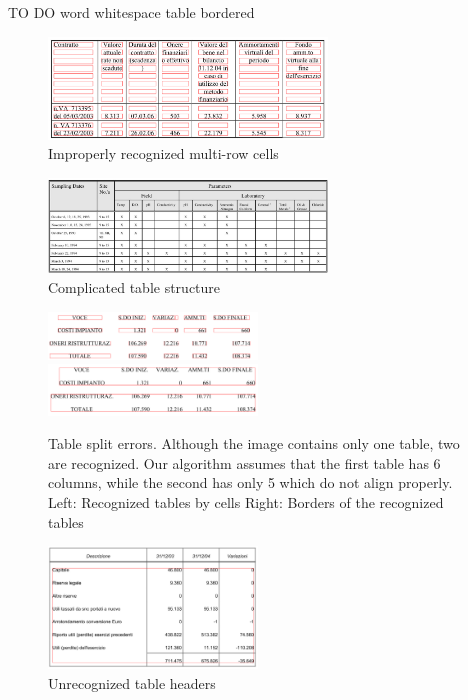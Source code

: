 TO DO
word whitespace
table bordered

\begin{figure}[t]
\centering
\includegraphics[width=20em]{img/results/errorMultiRow.png}
\caption{Improperly recognized multi-row cells}
\label{fig:errors}
\end{figure}

\begin{figure}[t]
\centering
\includegraphics[width=20em]{img/results/errorStructure.jpg}
\caption{Complicated table structure}
\label{fig:errors}
\end{figure}

\begin{figure}[t]
\centering

\includegraphics[width=15em]{img/results/otherErr1Cell.png}
\qquad
\includegraphics[width=15em]{img/results/otherErr1Table.png}

\caption{Table split errors. Although the image contains only one table, two are recognized. Our algorithm assumes that the first table has 6 columns, while the second has only 5 which do not align properly.
Left: Recognized tables by cells Right: Borders of the recognized tables}
\label{fig:errors}
\end{figure}

\begin{figure}[t]
\centering
\includegraphics[width=15em]{img/results/otherErr2.png}
\caption{Unrecognized table headers}
\label{fig:errors}
\end{figure}

